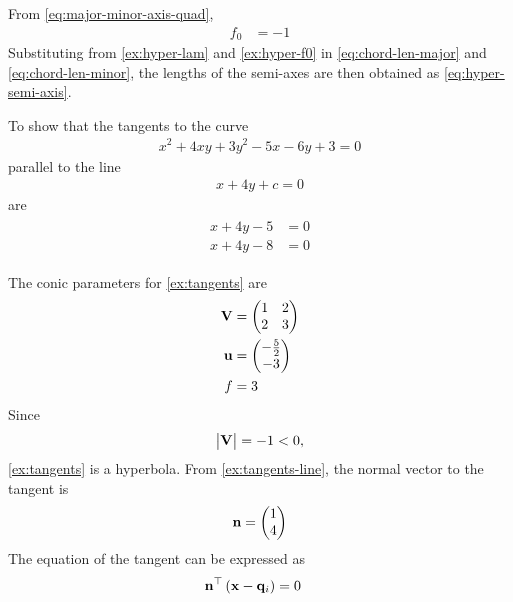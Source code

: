 From 
	  \eqref{eq:major-minor-axis-quad},
    \begin{align}
	    f_0 
	    &= -1
	    \label{ex:hyper-f0}
    \end{align}
    Substituting from 
	    \eqref{ex:hyper-lam}
	    and 
	    \eqref{ex:hyper-f0}
	    in 
\eqref{eq:chord-len-major}
and
\eqref{eq:chord-len-minor}, 
    the lengths of the semi-axes are then obtained as 
		\eqref{eq:hyper-semi-axis}.
\begin{example}[tangents]
To show that the tangents to the curve 
	\begin{align}
\label{ex:tangents} 
		x^2 + 4xy + 3y^2-5x-6y+3=0
	\end{align}
	parallel to the line 
	\begin{align}
\label{ex:tangents-line} 
x+4y+c = 0
	\end{align}
	are 
	\begin{align}
\label{ex:tangents-lines} 
		\begin{split}
		x+4y-5 &= 0
		\\
		x+4y-8 &= 0
		\end{split}
	\end{align}
\end{example}
\solution   The conic parameters for
\eqref{ex:tangents} 
are 
\begin{align}
	    \label{ex:tangents-V}
	\mathbf{V} &=\begin{pmatrix}1 & 2\\2 & 3 \end{pmatrix}
\\
	    \label{ex:tangents-u}
	\mathbf{u} &= \begin{pmatrix}- \frac{5}{2}\\-3\end{pmatrix}
\\
f &= 3
	    \label{ex:tangents-f}
    \end{align}
    Since 
    \begin{align}
	    \begin{vmatrix}\mathbf{V}\end{vmatrix} = -1 < 0,
    \end{align}
\eqref{ex:tangents} is a hyperbola.  
    From 
\eqref{ex:tangents-line}, the normal vector to the tangent is 
    \begin{align}
	    \mathbf{n} = \begin{pmatrix}1\\4\end{pmatrix} 
	    \label{ex:tangents-normal}
    \end{align}
    The equation of the tangent can be expressed as 
    \begin{align}
	    \mathbf{n}^{\top} \left(  \mathbf{x}- \mathbf{q}_i \right)&= 0
    \end{align}
